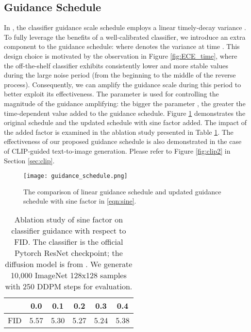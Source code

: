 \documentclass{article}
\theoremstyle{definition}
\begin{document}
\subsection{Guidance Schedule}
In \cite{dhariwal2021diffusion}, the classifier guidance scale schedule employs a linear timely-decay variance  \citep{ho2020denoising}.
To fully leverage the benefits of a well-calibrated classifier, we introduce an extra  component to the guidance schedule:   
where  denotes the variance at time .  
This design choice is motivated by the observation in Figure \ref{fig:ECE_time}, where the off-the-shelf classifier exhibits consistently lower and more stable  values during the large noise period (from the beginning to the middle of the reverse process). Consequently, we can amplify the guidance scale during this period to better exploit its effectiveness. The parameter  is used for controlling the magnitude of the guidance amplifying: the bigger the parameter , the greater the time-dependent  value added to the guidance schedule. 
Figure \ref{fig:guidance_schedule} demonstrates the original schedule and the updated schedule with sine factor  added. The impact of the added factor  is examined in the ablation study presented in Table \ref{table:ablation_gamma}. 
The effectiveness of our proposed guidance schedule is also demonstrated in the case of CLIP-guided text-to-image generation. Please refer to Figure \ref{fig:clip2} in Section \ref{sec:clip}.


\begin{figure}[h]
  \centering
\texttt{[image: guidance\_schedule.png]}
  \caption{The comparison of linear guidance schedule and updated guidance schedule with sine factor  in \eqref{eqn:sine}.}
  \label{fig:guidance_schedule}
\end{figure}


\begin{table}[h!]
\caption{Ablation study of sine factor  on classifier guidance with respect to FID. The classifier is the official Pytorch ResNet checkpoint; the diffusion model is from \cite{dhariwal2021diffusion}. We generate 10,000 ImageNet 128x128 samples with 250 DDPM steps for evaluation.}
\label{table:ablation_gamma}
\begin{center}
\begin{small}
\begin{sc}
\begin{tabular}{lccccc}
\toprule
   & 0.0 & 0.1 & 0.2 & 0.3 & 0.4  \\
\midrule
FID     & 5.57 & 5.30 & 5.27 & 5.24 & 5.38 \\

\bottomrule
\end{tabular}
\end{sc}
\end{small}
\end{center}
\end{table}
\end{document}
